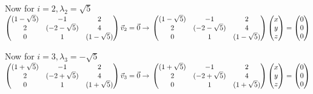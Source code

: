 \documentclass{article}
\begin{document}
Now for $i=2, \lambda_{2}=\sqrt{5}$\\
$
\left (
    \begin{matrix}
        (1-\sqrt{5}) & -1 & 2\\
        2 & (-2-\sqrt{5}) & 4\\
        0 & 1 & (1-\sqrt{5})
    \end{matrix}
\right )
\vec{v}_{2} = \vec{0} \rightarrow\\
\left (
    \begin{matrix}
        (1-\sqrt{5}) & -1 & 2\\
        2 & (-2-\sqrt{5}) & 4\\
        0 & 1 & (1-\sqrt{5})
    \end{matrix}
\right )
\left (
    \begin{matrix}
        x\\
        y\\
        z
    \end{matrix}
\right )
=
\left (
    \begin{matrix}
        0\\
        0\\
        0
    \end{matrix}
\right )
$

Now for $i=3, \lambda_{3}=-\sqrt{5}$\\
$
\left (
    \begin{matrix}
        (1+\sqrt{5}) & -1 & 2\\
        2 & (-2+\sqrt{5}) & 4\\
        0 & 1 & (1+\sqrt{5})
    \end{matrix}
\right )
\vec{v}_{3} = \vec{0} \rightarrow\\
\left (
    \begin{matrix}
        (1+\sqrt{5}) & -1 & 2\\
        2 & (-2+\sqrt{5}) & 4\\
        0 & 1 & (1+\sqrt{5})
    \end{matrix}
\right )
\left (
    \begin{matrix}
        x\\
        y\\
        z
    \end{matrix}
\right )
=
\left (
    \begin{matrix}
        0\\
        0\\
        0
    \end{matrix}
\right )
$
\end{document}
